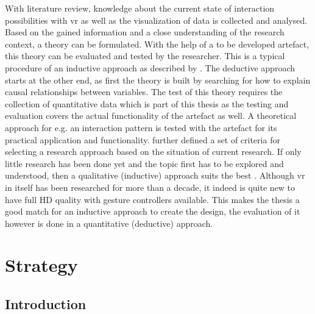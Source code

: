 With literature review, knowledge about the current state of interaction possibilities with \gls{vr} as well as the visualization of data is collected and analysed. Based on the gained information and a close understanding of the research context, a theory can be formulated. With the help of a to be developed artefact, this theory can be evaluated and tested by the researcher. This is a typical procedure of an inductive approach as described by \cite{Saunders2009}. The deductive approach starts at the other end, as first the theory is built by searching for how to explain causal relationships between variables. The test of this theory requires the collection of quantitative data which is part of this thesis as the testing and evaluation covers the actual functionality of the artefact as well. A theoretical approach for e.g. an interaction pattern is tested with the artefact for its practical application and functionality. \newline
\cite{Creswell2014} further defined a set of criteria for selecting a research approach based on the situation of current research. If only little research has been done yet and the topic first has to be explored and understood, then a qualitative (inductive) approach suits the best \citep{Creswell2014}. Although \gls{vr} in itself has been researched for more than a decade, it indeed is quite new to have full HD quality with gesture controllers available. This makes the thesis a good match for an inductive approach to create the design, the evaluation of it however is done in a quantitative (deductive) approach.



\section{Strategy}


\subsection{Introduction}

